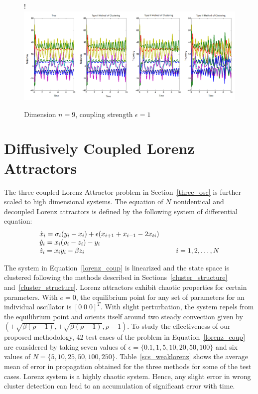 \begin{figure}[H]
\centering
\resizebox {\textwidth} {!} {
\includegraphics[scale=0.5]{figures_2/fig_comp_9dim}
}
\caption{Dimension $n= 9$, coupling strength $\epsilon= 1$}
\label{plot_9dim}
\end{figure} 


\section{Diffusively Coupled Lorenz Attractors}

The three coupled Lorenz Attractor problem in Section~\ref{three_osc} is further scaled to high dimensional systems. The equation of $N$ nonidentical and decoupled Lorenz attractors is defined by the following system of differential equation:  
\begin{equation}
\label{lorenz_coup}
\begin{array}{lc}
\dot{x}_{i} = \sigma_i (y_{i} - x_{i}) + \epsilon (x_{i+1} + x_{i-1} - 2x_{ti})  \\
\dot{y}_{i} = x_{i}(\rho_i - z_i) - y_{i} \\
\dot{z}_{i} = x_{i}y_{i} - \beta z_{i} & \hspace{5 mm}
i = 1,2,\ldots,N
\end{array} 
\end{equation} %

The system in Equation~\ref{lorenz_coup} is linearized and the state space is clustered following the methods described in Sections~\ref{cluster_structure} and~\ref{cluster_structure}.  Lorenz attractors exhibit chaotic properties for certain parameters. With $e = 0$, the equilibrium point for any set of parameters for an individual oscillator is $[0 \; 0 \; 0]^T$. With slight perturbation, the system repels from the equilibrium point and orients itself around two steady convection given by $\left( \pm\sqrt{\beta(\rho-1)}, \pm\sqrt{\beta(\rho-1)}, \rho-1 \right)$. To study the effectiveness of our proposed methodology, 42 test cases of the problem in Equation~\ref{lorenz_coup} are considered by taking seven values of $\epsilon = \lbrace 0.1, 1, 5, 10, 20, 50, 100 \rbrace$ and six values of $N =  \lbrace 5, 10, 25, 50, 100, 250  \rbrace $. Table~\ref{scs_weaklorenz} shows the average mean of error in propagation obtained for the three methods for some of the test cases. Lorenz system is a highly chaotic system. Hence, any slight error in wrong cluster detection can lead to an accumulation of significant error with time.

